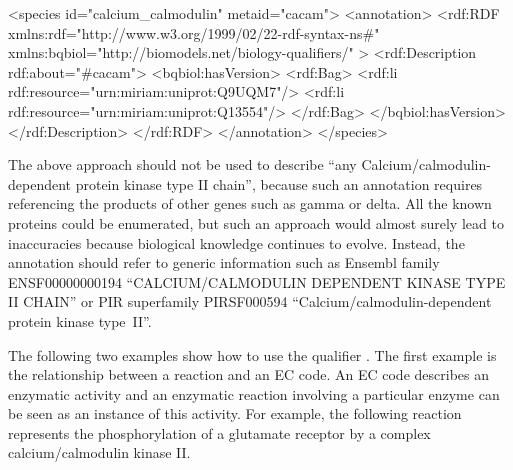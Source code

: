\begin{blockChanged}

\begin{example}
<species id="calcium_calmodulin" metaid="cacam">
  <annotation>
    <rdf:RDF
      xmlns:rdf="http://www.w3.org/1999/02/22-rdf-syntax-ns\#"
      xmlns:bqbiol="http://biomodels.net/biology-qualifiers/"
    >
      <rdf:Description rdf:about="\#cacam">
        <bqbiol:hasVersion>
          <rdf:Bag>
            <rdf:li rdf:resource="urn:miriam:uniprot:Q9UQM7"/>
            <rdf:li rdf:resource="urn:miriam:uniprot:Q13554"/>
          </rdf:Bag>
        </bqbiol:hasVersion>
      </rdf:Description>
    </rdf:RDF>
  </annotation>
</species>
\end{example}

\end{blockChanged}

The above approach should not be used to describe ``any
Calcium/calmodulin-dependent protein kinase type II chain'',
because such an annotation requires referencing the products of
other genes such as gamma or delta. All the known proteins could
be enumerated, but such an approach would almost surely lead to
inaccuracies because biological knowledge continues to evolve.
Instead, the annotation should refer to generic information such
as Ensembl family ENSF00000000194 ``CALCIUM/CALMODULIN DEPENDENT
KINASE TYPE II CHAIN'' or PIR superfamily PIRSF000594
``Calcium/calmodulin-dependent protein kinase type~II''.


The following two examples show how to use the qualifier
. The first example is the relationship
between a reaction and an EC code. An EC code describes an
enzymatic activity and an enzymatic reaction involving a
particular enzyme can be seen as an instance of this activity. For
example, the following reaction represents the phosphorylation of
a glutamate receptor by a complex calcium/calmodulin kinase II.

